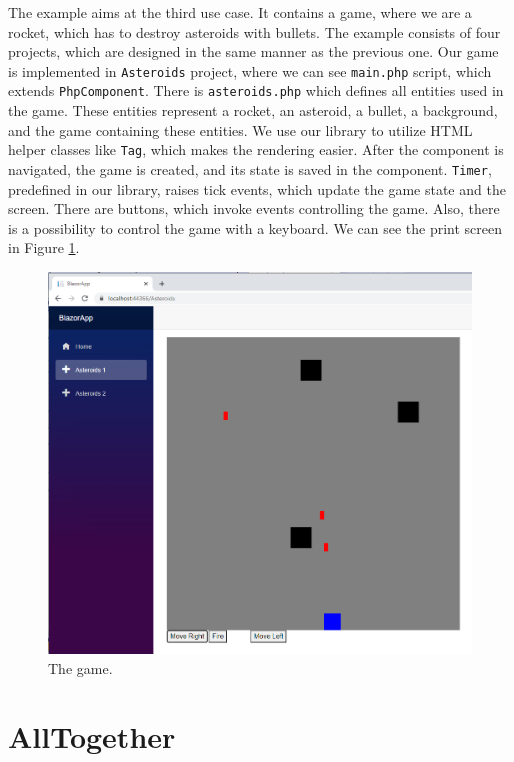 The example aims at the third use case.
It contains a game, where we are a rocket, which has to destroy asteroids with bullets.
The example consists of four projects, which are designed in the same manner as the previous one.
Our game is implemented in \texttt{Asteroids} project, where we can see \texttt{main.php} script, which extends \texttt{PhpComponent}.
There is \texttt{asteroids.php} which defines all entities used in the game.
These entities represent a rocket, an asteroid, a bullet, a background, and the game containing these entities.
We use our library to utilize HTML helper classes like \texttt{Tag}, which makes the rendering easier.
After the component is navigated, the game is created, and its state is saved in the component.
\texttt{Timer}, predefined in our library, raises tick events, which update the game state and the screen.
There are buttons, which invoke events controlling the game.
Also, there is a possibility to control the game with a keyboard.
We can see the print screen in Figure \ref{img28:game}.
\par
\begin{figure}[H]\centering
\includegraphics[scale=0.4]{./img/Asteroids}
\caption{The game.}
\label{img28:game}
\end{figure} 
\par
 

\section{AllTogether}

